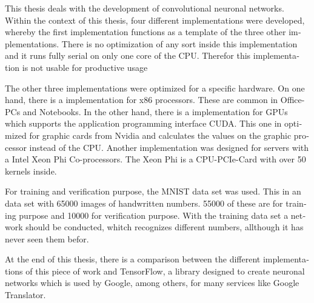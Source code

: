 \documentclass[../main.tex]{subfiles}
\begin{document}
\begin{otherlanguage}{english}
This thesis deals with the development of convolutional neuronal networks. Within the context of this thesis, four different implementations were developed, whereby the first implementation functions as a template of the three other implementations. There is no optimization of any sort inside this implementation and it runs fully serial on only one core of the CPU. Therefor this implementation is not usable for productive usage

The other three implementations were optimized for a specific hardware. On one hand, there is a implementation for x86 processors. These are common in Office-PCs and Notebooks. In the other hand, there is a implementation for GPUs which supports the application programming interface CUDA. This one in optimized for graphic cards from Nvidia and calculates the values on the graphic processor instead of the CPU. Another implementation was designed for servers with a Intel Xeon Phi Co-processors. The Xeon Phi is a CPU-PCIe-Card with over 50 kernels inside.

For training and verification purpose, the MNIST data set was used. This in an data set with 65000 images of handwritten numbers. 55000 of these are for training purpose and 10000 for verification purpose. With the training data set a network should be conducted, whitch recognizes different numbers, allthough it has never seen them befor.

At the end of this thesis, there is a comparison between the different implementations of this piece of work and TensorFlow, a library designed to create neuronal networks which is used by Google, among others, for many services like Google Translator.
\end{otherlanguage}
\end{document}
